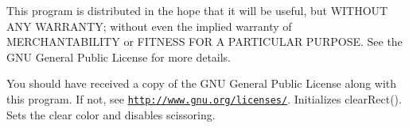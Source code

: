 This program is distributed in the hope that it will be useful, but W\+I\+T\+H\+O\+U\+T A\+N\+Y W\+A\+R\+R\+A\+N\+T\+Y; without even the implied warranty of M\+E\+R\+C\+H\+A\+N\+T\+A\+B\+I\+L\+I\+T\+Y or F\+I\+T\+N\+E\+S\+S F\+O\+R A P\+A\+R\+T\+I\+C\+U\+L\+A\+R P\+U\+R\+P\+O\+S\+E. See the G\+N\+U General Public License for more details.

You should have received a copy of the G\+N\+U General Public License along with this program. If not, see \href{http://www.gnu.org/licenses/}{\tt http\+://www.\+gnu.\+org/licenses/}. Initializes clear\+Rect(). Sets the clear color and disables scissoring. 